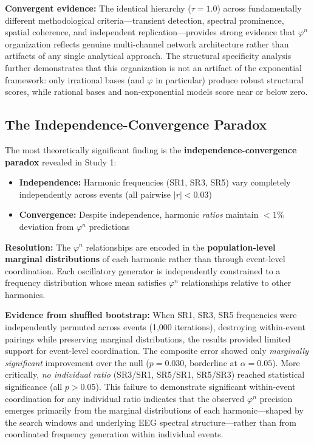 \documentclass[11pt,a4paper]{article}
\newcommand{\phisym}{\varphi}
\begin{document}
\textbf{Convergent evidence:} The identical hierarchy ($\tau = 1.0$) across fundamentally different methodological criteria---transient detection, spectral prominence, spatial coherence, and independent replication---provides strong evidence that $\phisym^n$ organization reflects genuine multi-channel network architecture rather than artifacts of any single analytical approach. The structural specificity analysis further demonstrates that this organization is not an artifact of the exponential framework: only irrational bases (and $\phisym$ in particular) produce robust structural scores, while rational bases and non-exponential models score near or below zero.

\subsection{The Independence-Convergence Paradox}

The most theoretically significant finding is the \textbf{independence-convergence paradox} revealed in Study 1:

\begin{itemize}
    \item \textbf{Independence:} Harmonic frequencies (SR1, SR3, SR5) vary completely independently across events (all pairwise $|r| < 0.03$)
    \item \textbf{Convergence:} Despite independence, harmonic \textit{ratios} maintain $<1\%$ deviation from $\phisym^n$ predictions
\end{itemize}

\textbf{Resolution:} The $\phisym^n$ relationships are encoded in the \textbf{population-level marginal distributions} of each harmonic rather than through event-level coordination. Each oscillatory generator is independently constrained to a frequency distribution whose mean satisfies $\phisym^n$ relationships relative to other harmonics.

\textbf{Evidence from shuffled bootstrap:} When SR1, SR3, SR5 frequencies were independently permuted across events (1,000 iterations), destroying within-event pairings while preserving marginal distributions, the results provided limited support for event-level coordination. The composite error showed only \textit{marginally significant} improvement over the null ($p = 0.030$, borderline at $\alpha = 0.05$). More critically, \textit{no individual ratio} (SR3/SR1, SR5/SR1, SR5/SR3) reached statistical significance (all $p > 0.05$). This failure to demonstrate significant within-event coordination for any individual ratio indicates that the observed $\phisym^n$ precision emerges primarily from the marginal distributions of each harmonic---shaped by the search windows and underlying EEG spectral structure---rather than from coordinated frequency generation within individual events.
\end{document}
